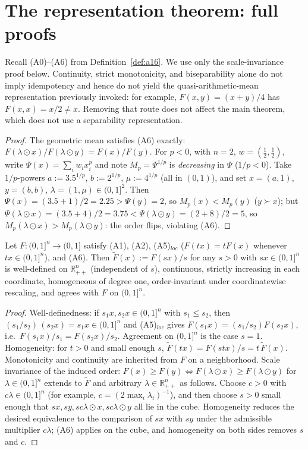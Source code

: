 \section{The representation theorem: full proofs}\label{app:representation}

Recall (A0)--(A6) from Definition~\ref{def:a16}. We use only the
scale-invariance proof below. Continuity, strict monotonicity, and
biseparability alone do not imply idempotency and hence do not yield the
quasi-arithmetic-mean representation previously invoked: for example,
$F(x,y)=(x+y)/4$ has $F(x,x)=x/2\neq x$. Removing that route does not affect
the main theorem, which does not use a separability representation.

\begin{lemma}\label{lem:ax6b}
\end{lemma}
\begin{proof}
The geometric mean satisfies (A6) exactly:
$F(\lambda\odot x)/F(\lambda\odot y)=F(x)/F(y)$. For $p<0$, with $n=2$,
$w=(\tfrac12,\tfrac12)$, write $\Psi(x)=\sum_iw_ix_i^p$ and note
$M_p=\Psi^{1/p}$ is \emph{decreasing} in $\Psi$ ($1/p<0$). Take $1/p$-powers
$a:=3.5^{1/p}$, $b:=2^{1/p}$, $\mu:=4^{1/p}$ (all in $(0,1)$), and set
$x=(a,1)$, $y=(b,b)$, $\lambda=(1,\mu)\in(0,1]^2$. Then
$\Psi(x)=(3.5+1)/2=2.25>\Psi(y)=2$, so $M_p(x)<M_p(y)$ ($y\succ x$); but
$\Psi(\lambda\odot x)=(3.5+4)/2=3.75<\Psi(\lambda\odot y)=(2+8)/2=5$, so
$M_p(\lambda\odot x)>M_p(\lambda\odot y)$: the order flips, violating (A6).
\end{proof}

\begin{lemma}\label{lem:homog-ext}
Let $F:(0,1]^n\to(0,1]$ satisfy \textup{(A1)}, \textup{(A2)},
\textup{(A5)}$_{loc}$ ($F(tx)=tF(x)$ whenever $tx\in(0,1]^n$), and
\textup{(A6)}. Then $\tilde F(x):=F(sx)/s$ for any $s>0$ with
$sx\in(0,1]^n$ is well-defined on $\mathbb{R}_{++}^n$ (independent of $s$),
continuous, strictly increasing in each coordinate, homogeneous of degree
one, order-invariant under coordinatewise rescaling, and agrees with $F$ on
$(0,1]^n$.
\end{lemma}
\begin{proof}
Well-definedness: if $s_1x,s_2x\in(0,1]^n$ with $s_1\le s_2$, then
$(s_1/s_2)\,(s_2x)=s_1x\in(0,1]^n$ and \textup{(A5)}$_{loc}$ gives
$F(s_1x)=(s_1/s_2)F(s_2x)$, i.e.\ $F(s_1x)/s_1=F(s_2x)/s_2$. Agreement on
$(0,1]^n$ is the case $s=1$. Homogeneity: for $t>0$ and small enough $s$,
$\tilde F(tx)=F(stx)/s=t\,\tilde F(x)$. Monotonicity and continuity are
inherited from $F$ on a neighborhood. Scale invariance of the induced order:
$F(x)\ge F(y)\iff F(\lambda\odot x)\ge F(\lambda\odot y)$ for
$\lambda\in(0,1]^n$ extends to $\tilde F$ and arbitrary
$\lambda\in\mathbb{R}_{++}^n$ as follows. Choose $c>0$ with
$c\lambda\in(0,1]^n$ (for example, $c=(2\max_i\lambda_i)^{-1}$), and then
choose $s>0$ small enough that $sx,sy,sc\lambda\odot x,sc\lambda\odot y$
all lie in the cube. Homogeneity reduces the desired equivalence to the
comparison of $sx$ with $sy$ under the admissible multiplier $c\lambda$;
(A6) applies on the cube, and homogeneity on both sides removes $s$ and $c$.
\end{proof}

